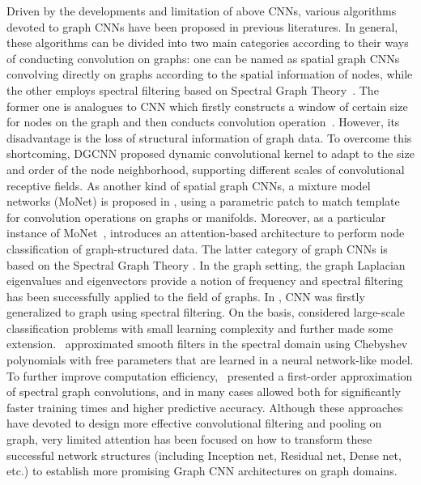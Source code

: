 \documentclass[journal]{IEEEtran}
\begin{document}
Driven by the developments and limitation of above CNNs,  various algorithms devoted to graph CNNs have been proposed in previous literatures.
In general, these algorithms can be divided into two main categories according to their ways of conducting convolution on graphs: one can be named as spatial graph CNNs convolving directly on graphs according to the spatial information of nodes,  while  the other employs spectral filtering based on Spectral Graph Theory~\cite{chung1997spectral}.
The former one is  analogues to  CNN which firstly constructs a window of certain size for nodes on the graph and then  conducts convolution operation~\cite{niepert2016learning}. However,
its disadvantage is the loss of structural information of graph data. To overcome this shortcoming, DGCNN \cite{DGCNN} proposed dynamic convolutional kernel to adapt to the size and order of the node neighborhood, supporting different scales of convolutional receptive fields. As another kind of spatial graph CNNs, a mixture model networks (MoNet) is proposed in \cite{monet}, using a parametric patch to match template for convolution operations on graphs or manifolds. Moreover,  as a particular instance of MoNet~\cite{monet}, \cite{2017GraphAttentionnNet}
introduces an attention-based architecture to perform node classification of graph-structured data. The latter category of graph CNNs is based on the Spectral Graph Theory \cite{chung1997spectral}. In the graph setting, the graph Laplacian eigenvalues and eigenvectors provide a notion of frequency \cite{shuman2013emerging} and spectral filtering has been successfully applied to the field of graphs. In \cite{BrunaZSL13}, CNN was firstly generalized to graph using spectral filtering. On the basis, \cite{henaff2015deep} considered large-scale classification problems with small learning complexity and further made some extension.~\cite{defferrard2016conv} approximated smooth filters in the spectral domain using Chebyshev polynomials with free parameters that are learned in a neural network-like model. To further improve computation efficiency,~\cite{kipf2016semi} presented a first-order approximation of spectral graph convolutions, and in many cases allowed both for significantly faster training times and higher predictive accuracy.
Although these approaches have devoted to design more effective convolutional filtering and pooling on graph, very limited attention has been focused on how to transform these successful network structures (including Inception net, Residual net, Dense net, etc.) to establish more promising Graph CNN architectures on graph domains.
\end{document}
